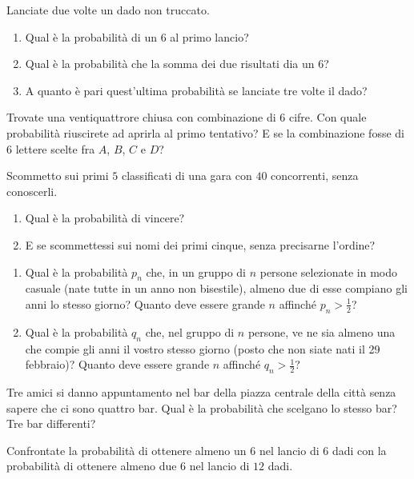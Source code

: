 \Esercizio{}

Lanciate due volte un dado non truccato.
\begin{enumerate}
	\item Qual è la probabilità di un $6$ al primo lancio?
	\item Qual è la probabilità che la somma dei due risultati dia un $6$?
	\item A quanto è pari quest'ultima probabilità se lanciate tre volte il dado?
\end{enumerate}

\Esercizio{}

Trovate una ventiquattrore chiusa con combinazione di $6$ cifre. Con quale probabilità riuscirete ad aprirla al primo tentativo? E se la combinazione fosse di $6$ lettere scelte fra $A$, $B$, $C$ e $D$?

\Esercizio{}

Scommetto sui primi $5$ classificati di una gara con $40$ concorrenti, senza conoscerli.
\begin{enumerate}
	\item Qual è la probabilità di vincere?
	\item E se scommettessi sui nomi dei primi cinque, senza precisarne l'ordine?
\end{enumerate}


\begin{enumerate}
	\item Qual è la probabilità $p_{n}$ che, in un gruppo di $n$ persone selezionate in modo casuale (nate tutte in un anno non bisestile), almeno due di esse compiano gli anni lo stesso giorno? Quanto deve essere grande $n$ affinché $p_{n}  >\frac{1}{2}$?
	\item Qual è la probabilità $q_{n}$ che, nel gruppo di $n$ persone, ve ne sia almeno una che compie gli anni il vostro stesso giorno (posto che non siate nati il 29 febbraio)? Quanto deve essere grande $n$ affinché $q_{n}  >\frac{1}{2}$?
\end{enumerate}

\Esercizio{}

Tre amici si danno appuntamento nel bar della piazza centrale della città senza sapere che ci sono quattro bar. Qual è la probabilità che scelgano lo stesso bar? Tre bar differenti?

\Esercizio{}

Confrontate la probabilità di ottenere almeno un $6$ nel lancio di $6$ dadi con la probabilità di ottenere almeno due $6$ nel lancio di $12$ dadi.

